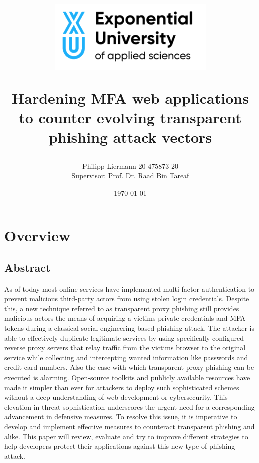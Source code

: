 \documentclass[12pt]{scrbook}
\begin{document}
\author{Philipp Liermann 20-475873-20\\Supervisor: Prof. Dr. Raad Bin Tareaf}
\date{\today}

\title{ \begin{center} \includegraphics[width=8cm]{./images/logo.png}
	\end{center} \vspace{2cm} Hardening MFA web applications to counter evolving
	transparent phishing attack vectors \vspace{2cm} \large }

\maketitle

\newpage \tableofcontents

\newpage \chapter{Overview} \section{Abstract} As of today most online
services have implemented multi-factor authentication to prevent malicious
third-party actors from using stolen login credentials. Despite this, a new
technique referred to as transparent proxy phishing still provides malicious
actors the means of acquiring a victims private credentials and MFA tokens
during a classical social engineering based phishing attack. The attacker is
able to effectively duplicate legitimate services by using specifically
configured reverse proxy servers that relay traffic from the victims browser
to the original service while collecting and intercepting wanted information
like passwords and credit card numbers. Also the ease with which transparent
proxy phishing can be executed is alarming. Open-source toolkits and
publicly available resources have made it simpler than ever for attackers to
deploy such sophisticated schemes without a deep understanding of web
development or cybersecurity. This elevation in threat sophistication
underscores the urgent need for a corresponding advancement in defensive
measures. To resolve this issue, it is imperative to develop and implement
effective measures to counteract transparent phishing and alike. This paper
will review, evaluate and try to improve different strategies to help
developers protect their applications against this new type of phishing attack.
\end{document}
